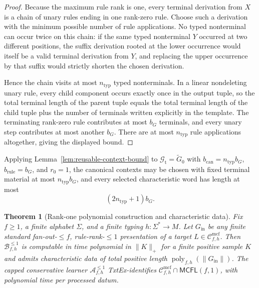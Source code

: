 \documentclass[11pt]{article}
\numberwithin{equation}{section}
\theoremstyle{plain}
\newtheorem{theorem}{Theorem}[section]
\theoremstyle{definition}
\theoremstyle{remark}
\newcommand{\Cmcf}[2]{\mathcal{C}^{\mathrm{mcf}}_{#1,#2}}
\begin{document}
\begin{proof}
Because the maximum rule rank is one, every terminal derivation from $X$ is a
chain of unary rules ending in one rank-zero rule.  Choose such a derivation
with the minimum possible number of rule applications.  No typed nonterminal can
occur twice on this chain: if the same typed nonterminal $Y$ occurred at two
different positions, the suffix derivation rooted at the lower occurrence
would itself be a valid terminal derivation from $Y$, and replacing the upper
occurrence by that suffix would strictly shorten the chosen derivation.

Hence the chain visits at most $n_{\mathrm{typ}}$ typed nonterminals.  In a linear nondeleting
unary rule, every child component occurs exactly once in the output tuple, so
the total terminal length of the parent tuple equals the total terminal length
of the child tuple plus the number of terminals written explicitly in the
template.  The terminating rank-zero rule contributes at most $b_G$ terminals,
and every unary step contributes at most another $b_G$.  There are at most
$n_{\mathrm{typ}}$ rule applications altogether, giving the displayed bound.
\end{proof}

Applying Lemma~\ref{lem:reusable-context-bound} to $\mathcal G_{\mathrm t}=\widetilde G_0$ with
$b_{\mathrm{can}}=n_{\mathrm{typ}}b_G$, $b_{\mathrm{rule}}=b_G$, and $r_0=1$, the canonical contexts may be chosen
with fixed terminal material at most $n_{\mathrm{typ}}b_G$, and every selected
characteristic word has length at most
\[
  (2n_{\mathrm{typ}}+1)b_G.
\]

\begin{theorem}[Rank-one polynomial construction and characteristic data]
\label{thm:rankone-polydata}
Fix $f\ge1$, a finite alphabet $\Sigma$, and a finite typing
$h:\Sigma^*\to M$.  Let $G_{\mathrm{in}}$ be any finite standard fan-out-$\le f$,
rule-rank-$\le1$ presentation of a target $L\in\Cmcf{f}{h}$.  Then
$\mathcal B_{f,h}^{\le1}$ is computable in time polynomial in $\|K\|_+$ for a finite positive
sample $K$ and admits characteristic data of total positive length
$\operatorname{poly}_{f,h}(\|G_{\mathrm{in}}\|)$.  The capped conservative learner
$\mathcal A_{f,h}^{\le1}$ TxtEx-identifies
$\Cmcf{f}{h}\cap\mathsf{MCFL}(f,1)$, with polynomial time per processed datum.
\end{theorem}
\end{document}
